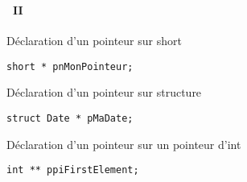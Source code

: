 \begin{frame}[containsverbatim]
  \frametitle{\secname}
  \framesubtitle{\subsecname~II}

  \begin{exampleblock}{Déclaration d'un pointeur sur short}
    \begin{verbatim}
short * pnMonPointeur;\end{verbatim}
  \end{exampleblock}
  \vspace{0.3cm}
  \begin{exampleblock}{Déclaration d'un pointeur sur structure}
    \begin{verbatim}
struct Date * pMaDate;\end{verbatim}
  \end{exampleblock}
  \vspace{0.3cm}
  \begin{exampleblock}{Déclaration d'un pointeur sur un pointeur d'int}
    \begin{verbatim}
int ** ppiFirstElement;\end{verbatim}
  \end{exampleblock}
\end{frame}

